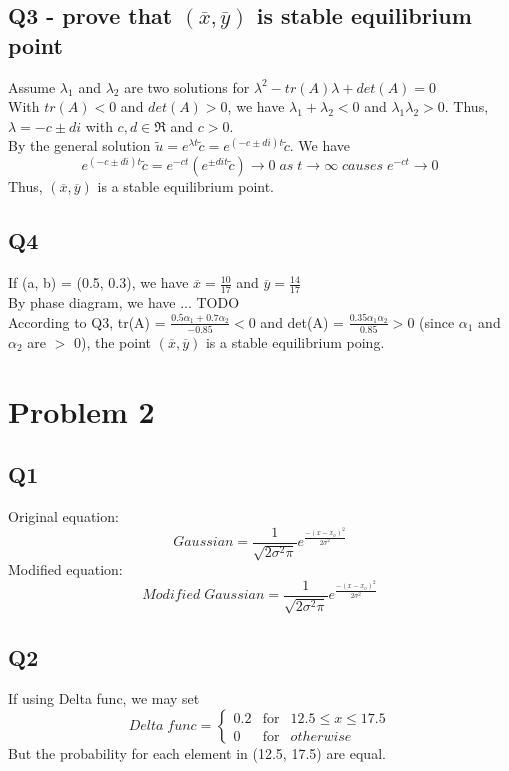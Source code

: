 \documentclass [12pt] {article}
\begin{document}
	\subsection {Q3 - prove that $(\overline{x}, \overline{y})$ is stable equilibrium point}
	Assume $\lambda_1$ and $\lambda_2$ are two solutions for $\lambda^2 - tr(A)\lambda+det(A) = 0$\\
	With $tr(A) < 0$ and $det(A) > 0$, we have $\lambda_1+\lambda_2 < 0$ and $\lambda_1\lambda_2 > 0$. Thus, $\lambda = -c \pm di$ with $c, d \in \Re$ and $c > 0.$\\
	By the general solution $\widetilde{u} = e^{\lambda t}\widetilde{c} = e^{(-c\pm di)t}\widetilde{c}$. We have
	\[e^{(-c\pm di)t}\widetilde{c} = e^{-ct}(e^{\pm dit}\widetilde{c}) \rightarrow 0 \;as \;t \rightarrow \infty \;causes \;e^{-ct}\rightarrow 0\]
	Thus, $(\overline{x}, \overline{y})$ is a stable equilibrium point.
	\subsection {Q4}
	If (a, b) = (0.5, 0.3), we have $\overline{x} = \frac{10}{17}$ and $\overline{y} = \frac{14}{17}$\\
	By phase diagram, we have ... TODO\\
	According to Q3, tr(A) = $\frac{0.5\alpha_1+0.7\alpha_2}{-0.85} < 0$ and det(A) = $\frac{0.35\alpha_1\alpha_2}{0.85} > 0$ (since $\alpha_1$ and $\alpha_2$ are $>$ 0), the point $(\overline{x}, \overline{y})$ is a stable equilibrium poing.

	\section {Problem 2}
	\subsection {Q1}
	Original equation:
	\[Gaussian = \frac{1}{\sqrt{2\sigma^2\pi}}e^{\frac{-(x-x_o)^2}{2\sigma^2}}\]
	Modified equation:
	\[Modified \;Gaussian = \frac{1}{\sqrt{2\sigma^2\pi}}e^{\frac{-(x-x_o)^2}{2\sigma^2}}\]
	\subsection {Q2}
	If using Delta func, we may set
	\[Delta \;func = \left\{ \begin{array}{rcl} 0.2 & \mbox{for} & 12.5\leq x\leq17.5 \\
												0 & \mbox{for} & otherwise\end{array} \right.\]
	But the probability for each element in (12.5, 17.5) are equal.
\end{document}
